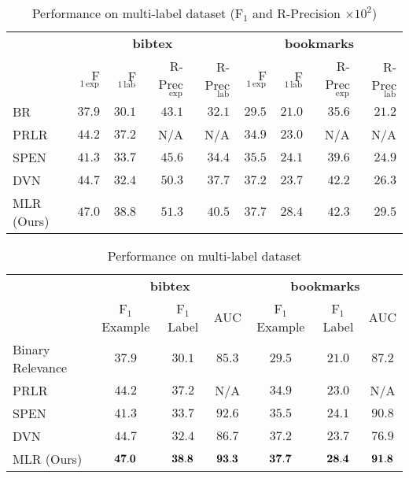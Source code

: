 \begin{table}[!h]
\centering
\newcommand{\nan}{{\scriptsize N/A}}
\caption{Performance on multi-label dataset (F$_1$ and R-Precision $\times 10^2$)}
\label{tab:perf_mlc}
\small
\begin{tabular}{l|*{4}{r}|*{4}{r}}
\toprule
{} & \multicolumn{4}{c|}{\textbf{bibtex}} & \multicolumn{4}{c}{\textbf{bookmarks}} \\
{} & F$_{1\,\text{exp}}$ & F$_{1\,\text{lab}}$ & R-Prec$_{\,\text{exp}}$ & R-Prec$_{\,\text{lab}}$ 
   & F$_{1\,\text{exp}}$ & F$_{1\,\text{lab}}$ & R-Prec$_{\,\text{exp}}$ & R-Prec$_{\,\text{lab}}$ \\
\midrule
BR~\cite{tsoumakas2006multi}       &  $37.9$  &  $30.1$  &  $43.1$  &  $32.1$  &  $29.5$  &  $21.0$  &  $35.6$  &  $21.2$ \\
PRLR~\cite{lin2014multi}           &  $44.2$  &  $37.2$  &    \nan  &    \nan  &  $34.9$  &  $23.0$  &    \nan  &    \nan \\
SPEN~\cite{belanger2016structured} &  $41.3$  &  $33.7$  &  $45.6$  &  $34.4$  &  $35.5$  &  $24.1$  &  $39.6$  &  $24.9$ \\
DVN~\cite{gygli2017deep}           &  $44.7$  &  $32.4$  &  $50.3$  &  $37.7$  &  $37.2$  &  $23.7$  &  $42.2$  &  $26.3$ \\
\rowcolor[gray]{0.8}
MLR (Ours)                         &  $47.0$  &  $38.8$  &  $51.3$  &  $40.5$  &  $37.7$  &  $28.4$  &  $42.3$  &  $29.5$ \\
\bottomrule
\end{tabular}
\end{table}


\begin{table}[!h]
\centering
\caption{Performance on multi-label dataset}
\label{tab:perf_mlc}
\setlength{\tabcolsep}{2pt} %
\begin{tabular}{l|ccc|ccc}
\toprule
{} & \multicolumn{3}{c|}{\textbf{bibtex}} & \multicolumn{3}{c}{\textbf{bookmarks}} \\
{} &   F$_1$ Example & F$_1$ Label &    AUC &      F$_1$ Example & F$_1$ Label &    AUC \\
\midrule
Binary Relevance~\cite{}           &          $37.9$ &      $30.1$ & $85.3$ &             $29.5$ &      $21.0$ & $87.2$ \\
PRLR~\cite{lin2014multi}           &          $44.2$ &      $37.2$ &    N/A &             $34.9$ &      $23.0$ &    N/A \\
SPEN~\cite{belanger2016structured} &          $41.3$ &      $33.7$ & $92.6$ &             $35.5$ &      $24.1$ & $90.8$ \\
DVN~\cite{gygli2017deep}           &          $44.7$ &      $32.4$ & $86.7$ &             $37.2$ &      $23.7$ & $76.9$ \\
MLR (Ours)                         &          ${\bf 47.0}$ & ${\bf 38.8}$ & ${\bf 93.3}$ & ${\bf 37.7}$ & ${\bf 28.4}$ & ${\bf 91.8}$ \\
\bottomrule
\end{tabular}
\end{table}


